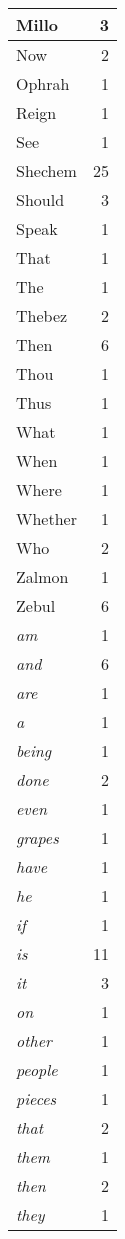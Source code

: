 \begin{center}
\begin{longtable}{l|r}
Millo & 3\\ \hline 
Now & 2\\ \hline 
Ophrah & 1\\ \hline 
Reign & 1\\ \hline 
See & 1\\ \hline 
Shechem & 25\\ \hline 
Should & 3\\ \hline 
Speak & 1\\ \hline 
That & 1\\ \hline 
The & 1\\ \hline 
Thebez & 2\\ \hline 
Then & 6\\ \hline 
Thou & 1\\ \hline 
Thus & 1\\ \hline 
What & 1\\ \hline 
When & 1\\ \hline 
Where & 1\\ \hline 
Whether & 1\\ \hline 
Who & 2\\ \hline 
Zalmon & 1\\ \hline 
Zebul & 6\\ \hline 
\emph{am} & 1\\ \hline 
\emph{and} & 6\\ \hline 
\emph{are} & 1\\ \hline 
\emph{a} & 1\\ \hline 
\emph{being} & 1\\ \hline 
\emph{done} & 2\\ \hline 
\emph{even} & 1\\ \hline 
\emph{grapes} & 1\\ \hline 
\emph{have} & 1\\ \hline 
\emph{he} & 1\\ \hline 
\emph{if} & 1\\ \hline 
\emph{is} & 11\\ \hline 
\emph{it} & 3\\ \hline 
\emph{on} & 1\\ \hline 
\emph{other} & 1\\ \hline 
\emph{people} & 1\\ \hline 
\emph{pieces} & 1\\ \hline 
\emph{that} & 2\\ \hline 
\emph{them} & 1\\ \hline 
\emph{then} & 2\\ \hline 
\emph{they} & 1\\ \hline 

\end{longtable}
\end{center}
